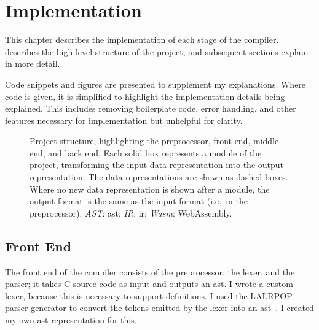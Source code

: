 \documentclass[00-main.tex]{subfiles}
\begin{document}
\chapter{Implementation}
\glsresetall %

This chapter describes the implementation of each stage of the compiler.
 describes the high-level structure of the project, and subsequent sections explain in more detail.

Code snippets and figures are presented to supplement my explanations.
Where code is given, it is simplified to highlight the implementation details being explained.
This includes removing boilerplate code, error handling, and other features necessary for implementation but unhelpful for clarity.

\begin{figure}[!t]
  \centering
  \caption{Project structure, highlighting the preprocessor, front end, middle end, and back end. Each solid box represents a module of the project, transforming the input data representation into the output representation. The data representations are shown as dashed boxes. Where no new data representation is shown after a module, the output format is the same as the input format (i.e.~in the preprocessor). \emph{AST}: \acrlong{ast}; \emph{IR}: \acrlong{ir}; \emph{Wasm}: WebAssembly.}%
  \label{fig:project flowchart}
\end{figure}



\section{Front End}\label{sec:impl:front end}


The front end of the compiler consists of the preprocessor, the lexer, and the parser; it takes C source code as input and outputs an \gls{ast}.
I wrote a custom lexer, because this is necessary to support  definitions.
I used the LALRPOP parser generator to convert the tokens emitted by the lexer into an \gls{ast}~.
I created my own \gls{ast} representation for this.
\end{document}
